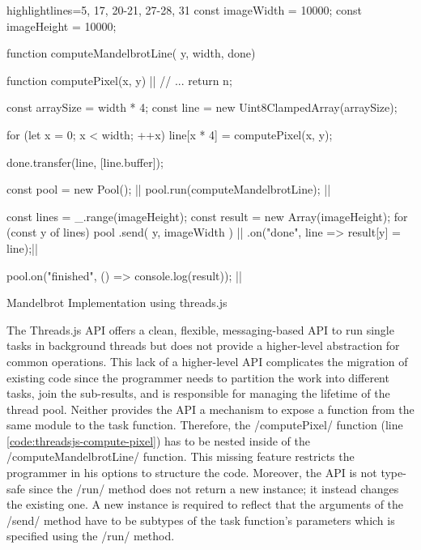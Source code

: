 \begin{listing}
	\begin{javascriptcode*}{highlightlines={5, 17, 20-21, 27-28, 31}}
const imageWidth = 10000;
const imageHeight = 10000;

function computeMandelbrotLine({ y, width}, done) {
	function computePixel(x, y) {|$\label{code:threadsjs-compute-pixel}$|
		// ...
		return n;
	}
	
	const arraySize = width * 4;
	const line = new Uint8ClampedArray(arraySize);

	for (let x = 0; x < width; ++x) {
		line[x * 4] = computePixel(x, y);
	}

	done.transfer(line, [line.buffer]);
}

const pool = new Pool(); |$\label{code:threadsjs-pool}$|
pool.run(computeMandelbrotLine); |$\label{code:threadsjs-worker}$|

const lines = _.range(imageHeight);
const result = new Array(imageHeight);
for (const y of lines) {
	pool
		.send({ y, imageWidth }) |$\label{code:threadsjs-messaging}$|
		.on("done", line => result[y] = line);|$\label{code:threadsjs-task-completion}$|
}

pool.on("finished", () => console.log(result)); |$\label{code:threadsjs-done}$|
\end{javascriptcode*}
\caption{Mandelbrot Implementation using threads.js}
\label{fig:mandelbrot-threadsjs}
\end{listing}


The Threads.js API offers a clean, flexible, messaging-based API to run single tasks in background threads but does not provide a higher-level abstraction for common operations. This lack of a higher-level API complicates the migration of existing code since the programmer needs to partition the work into different tasks, join the sub-results, and is responsible for managing the lifetime of the thread pool. Neither provides the API a mechanism to expose a function from the same module to the task function. Therefore, the \javascriptinline/computePixel/ function (line \ref{code:threadsjs-compute-pixel}) has to be nested inside of the \javascriptinline/computeMandelbrotLine/ function. This missing feature restricts the programmer in his options to structure the code. Moreover, the API is not type-safe since the \javascriptinline/run/ method does not return a new instance; it instead changes the existing one. A new instance is required to reflect that the arguments of the \javascriptinline/send/ method have to be subtypes of the task function's parameters which is specified using the \javascriptinline/run/ method. 

